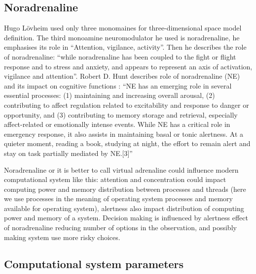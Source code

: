 \subsection{Noradrenaline}

Hugo L\"{o}vheim \cite{cubeofemotions} used only three monomaines for three-dimensional space model definition. The third monoamine neuromodulator he used is noradrenaline, he emphasises its role in ``Attention, vigilance, activity''. Then he describes the role of noradrenaline: ``while noradrenaline has been coupled to the fight or flight response and to stress and anxiety, and appears to represent an axis of activation, vigilance and attention''. Robert D. Hunt describes role of noradrenaline (NE) and its impact on cognitive functions \cite{norepinephrine} : ``NE has an emerging role in several essential processes: (1) maintaining and increasing overall arousal, (2) contributing to affect regulation related to excitability and response to danger or opportunity, and (3) contributing to memory storage and retrieval, especially affect-related or emotionally intense events. While NE has a critical role in emergency response, it also assists in maintaining basal or tonic alertness. At a quieter moment, reading a book, studying at night, the effort to remain alert and stay on task partially mediated by NE.[3]''

Noradrenaline or it is better to call virtual adrenaline could influence modern computational system like this: attention and concentration could impact computing power and memory distribution between processes and threads (here we use processes in the meaning of operating system processes and memory available for operating system), alertness also impact distribution of computing power and memory of a system. Decision making is influenced by alertness effect of noradrenaline reducing number of options in the observation, and possibly making system use more risky choices. 

\subsection{Computational system parameters}

